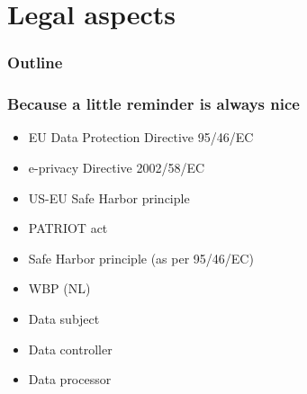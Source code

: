 \documentclass{beamer}
\begin{document}
\section{Legal aspects}

\begin{frame}
  \frametitle{Outline}
\end{frame}

\begin{frame}
    \frametitle{Because a little reminder is always nice}
    \begin{itemize}
        \item EU Data Protection Directive 95/46/EC
        \item e-privacy Directive 2002/58/EC %
        \item US-EU Safe Harbor principle
        \item PATRIOT act
        \item Safe Harbor principle (as per 95/46/EC)
        \item WBP (NL)
    \end{itemize}

    \begin{itemize}
        \item Data subject
        \item Data controller \checkmark
        \item Data processor \checkmark
    \end{itemize}
\end{frame}
\end{document}
